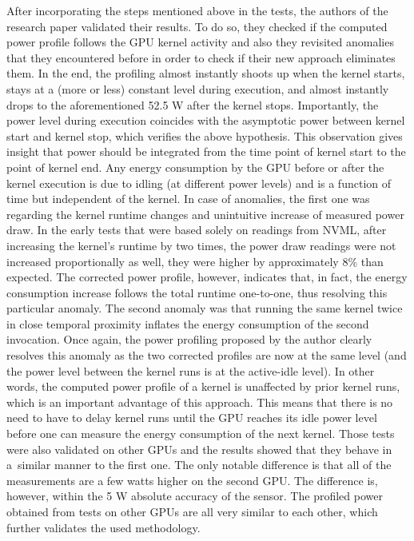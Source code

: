 After incorporating the steps mentioned above in the tests, the
authors of the research paper validated their results. To do so,
they checked if the computed power profile follows the GPU kernel
activity and also they revisited anomalies that they encountered
before in order to check if their new approach eliminates them.
In the end, the profiling almost instantly shoots up when the
kernel starts, stays at a (more or less) constant level during
execution, and almost instantly drops to the aforementioned 52.5 W
after the kernel stops. Importantly, the power level during
execution coincides with the asymptotic power between kernel start
and kernel stop, which verifies the above hypothesis. This
observation gives insight that power should be integrated from the
time point of kernel start to the point of kernel end. Any energy
consumption by the GPU before or after the kernel execution is due
to idling (at different power levels) and is a function of time
but independent of the kernel. In case of anomalies, the first one
was regarding the kernel runtime changes and unintuitive increase
of measured power draw. In the early tests that were based solely
on readings from NVML, after increasing the kernel's runtime by
two times, the power draw readings were not increased
proportionally as well, they were higher by approximately 8\% than
expected. The corrected power profile, however, indicates that, in
fact, the energy consumption increase follows the total runtime
one-to-one, thus resolving this particular anomaly. The second
anomaly was that running the same kernel twice in close temporal
proximity inflates the energy consumption of the second invocation.
Once again, the power profiling proposed by the author clearly
resolves this anomaly as the two corrected profiles are now at the
same level (and the power level between the kernel runs is at the
active-idle level). In other words, the computed power profile of
a kernel is unaffected by prior kernel runs, which is an important
advantage of this approach. This means that there is no need to
have to delay kernel runs until the GPU reaches its idle power
level before one can measure the energy consumption of the next
kernel. Those tests were also validated on other GPUs and the
results showed that they behave in a~similar manner to the first
one. The only notable difference is that all of the measurements
are a few watts higher on the second GPU\@. The difference is,
however, within the 5 W absolute accuracy of the sensor. The
profiled power obtained from tests on other GPUs are all very
similar to each other, which further validates the used methodology.

